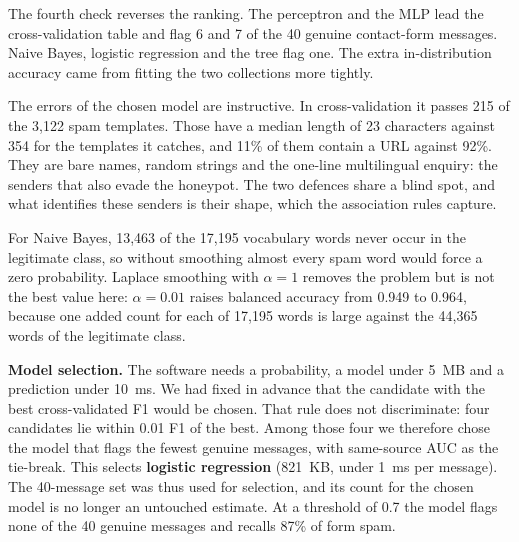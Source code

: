 \documentclass[conference]{IEEEtran}
\begin{document}
The fourth check reverses the ranking. The perceptron and the MLP lead the cross-validation table and flag 6
and 7 of the 40 genuine contact-form messages. Naive Bayes, logistic regression and the tree flag one. The
extra in-distribution accuracy came from fitting the two collections more tightly.

The errors of the chosen model are instructive. In cross-validation it passes 215 of the 3,122 spam templates.
Those have a median length of 23 characters against 354 for the templates it catches, and 11\% of them contain a
URL against 92\%. They are bare names, random strings and the one-line multilingual enquiry: the senders that
also evade the honeypot. The two defences share a blind spot, and what identifies these senders is their
shape, which the association rules capture.

For Naive Bayes, 13,463 of the 17,195 vocabulary words never occur in the legitimate class, so without
smoothing almost every spam word would force a zero probability. Laplace smoothing with $\alpha = 1$ removes
the problem but is not the best value here: $\alpha = 0.01$ raises balanced accuracy from 0.949 to 0.964,
because one added count for each of 17,195 words is large against the 44,365 words of the legitimate class.

\textbf{Model selection.} The software needs a probability, a model under 5~MB and a prediction under 10~ms.
We had fixed in advance that the candidate with the best cross-validated F1 would be chosen. That rule does not
discriminate: four candidates lie within 0.01 F1 of the best. Among those four we therefore chose the model
that flags the fewest genuine messages, with same-source AUC as the tie-break. This selects \textbf{logistic
regression} (821~KB, under 1~ms per message). The 40-message set was thus used for selection, and its count
for the chosen model is no longer an untouched estimate. At a threshold of 0.7 the model flags none of the 40
genuine messages and recalls 87\% of form spam.
\end{document}
